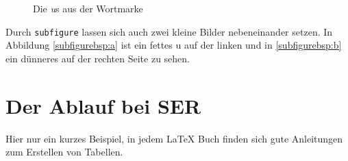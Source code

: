 \begin{figure}[ht]
    \centering
    \hspace{1cm}
    \caption{Die \emph{u}s aus der Wortmarke}
\end{figure}

Durch \verb|subfigure| lassen sich auch zwei kleine Bilder nebeneinander setzen. In Abbildung \ref{subfigurebsp:a} ist ein fettes u auf der linken und in \ref{subfigurebsp:b} ein dünneres auf der rechten Seite zu sehen.


\section{Der Ablauf bei SER}

Hier nur ein kurzes Beispiel, in jedem \LaTeX{} Buch finden sich gute Anleitungen zum Erstellen von Tabellen.





